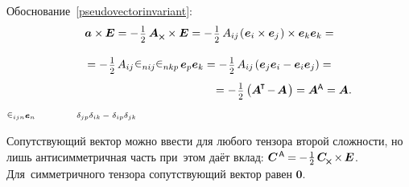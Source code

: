 \begin{otherlanguage}{russian}
Обоснование~\eqref{pseudovectorinvariant}: %
\nopagebreak\vspace{.1em}\[\begin{array}{c}
\bm{a} \times\hspace{-0.1ex} \bm{E} = - \hspace{.2ex} \smalldisplaystyleonehalf \hspace{.4ex} \bm{A}_{\Xcompanion} \times \bm{E} = - \hspace{.2ex} \smalldisplaystyleonehalf \, A_{ij} \hspace{-0.2ex}
\left( \hspace{.08ex} \tikzmark{beginFirstCrossProduct} {\bm{e}_i \times \bm{e}_j} \tikzmark{endFirstCrossProduct} \hspace{.16ex} \right)
\times \bm{e}_k \bm{e}_k = \\[1.5em]
%
= - \hspace{.2ex} \smalldisplaystyleonehalf \hspace{.32ex} A_{ij} \hspace{.12ex}
\tikzmark{beginTwoLeviCivitas} \levicivita_{nij} \levicivita_{nkp} \tikzmark{endTwoLeviCivitas}
\hspace{.32ex} \bm{e}_p \bm{e}_k = - \hspace{.2ex} \smalldisplaystyleonehalf \hspace{.32ex} A_{ij} \hspace{-0.1ex} \left( \bm{e}_j \bm{e}_i - \bm{e}_i \bm{e}_j \right) = \\[1em]
%
\hspace{13.2em}= - \hspace{.2ex} \smalldisplaystyleonehalf \left({ \bm{A}^{\hspace{-0.1em}\T} \hspace{-0.25ex} - \hspace{-0.2ex} \bm{A} \hspace{0.2ex}}\right) = \bm{A}^{\mathsf{\hspace{-0.1ex}A}} = \bm{A}.
\end{array}\]
%
{${\scriptstyle \levicivita_{ijn} \bm{e}_n}$}
%
{${\scriptstyle \hspace{3.2em}\delta_{jp} \delta_{ik} \,-\; \delta_{ip} \delta_{jk}}$}

\vspace{-0.55em} Сопутствующий вектор можно ввести для любого тензора второй сложности, но лишь антисимметричная часть при~этом даёт вклад: ${\bm{C}^{\hspace{.2ex}\mathsf{A}} \hspace{-0.1ex} = \hspace{-0.1ex} - \hspace{.1ex}\onehalf\hspace{.32ex} \bm{C}_{\hspace{-0.1ex}\Xcompanion} \hspace{-0.16ex} \times \hspace{-0.16ex} \bm{E}}$. Для~симметричного тензора сопутствующий вектор равен ${\bm{0}}$.


\end{otherlanguage}
